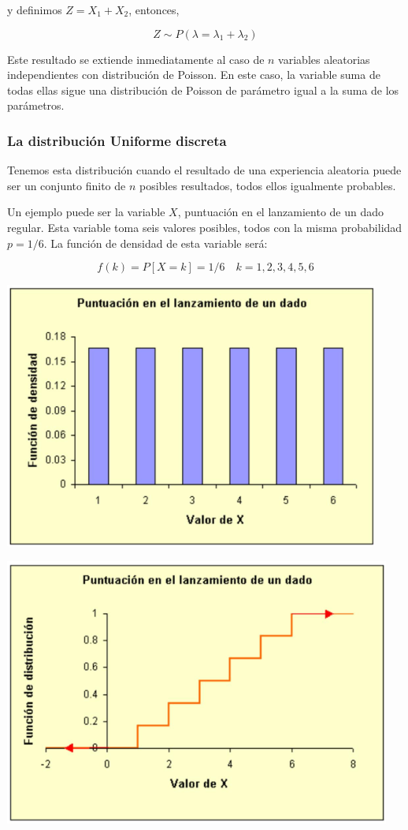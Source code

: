 \documentclass[
]{article}
\begin{document}
y definimos \(Z=X_{1}+X_{2}\), entonces,

\[
Z \sim P\left(\lambda=\lambda_{1}+\lambda_{2}\right)
\]

Este resultado se extiende inmediatamente al caso de \(n\) variables aleatorias independientes con distribución de Poisson. En este caso, la variable suma de todas ellas sigue una distribución de Poisson de parámetro igual a la suma de los parámetros.

\subsubsection{La distribución Uniforme discreta}\label{la-distribuciuxf3n-uniforme-discreta}

Tenemos esta distribución cuando el resultado de una experiencia aleatoria puede ser un conjunto finito de \(n\) posibles resultados, todos ellos igualmente probables.

Un ejemplo puede ser la variable \(X\), puntuación en el lanzamiento de un dado regular. Esta variable toma seis valores posibles, todos con la misma probabilidad \(p=1 / 6\). La función de densidad de esta variable será:

\[
f(k)=P[X=k]=1 / 6 \quad k=1,2,3,4,5,6
\]

\includegraphics[width=0.8\linewidth]{images/pmfUnifDiscreta}

\includegraphics[width=0.8\linewidth]{images/cdfUnifDiscreta}
\end{document}

